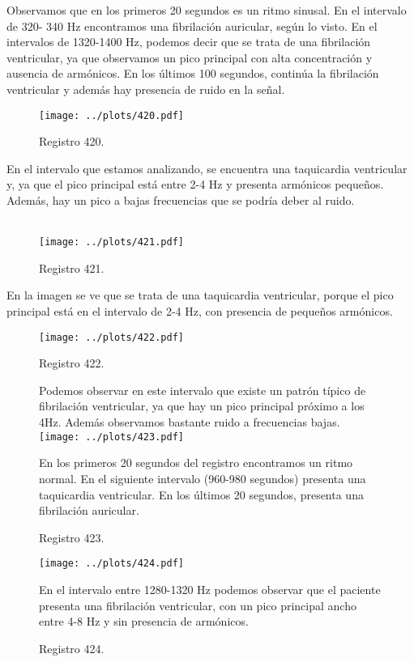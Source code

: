 \documentclass{article}
\begin{document}
Observamos que en los primeros 20 segundos es un ritmo sinusal. En el
intervalo de 320- 340 Hz encontramos una fibrilación auricular, según
lo visto. En el intervalos de 1320-1400 Hz, podemos decir que se trata
de una fibrilación ventricular, ya que observamos un pico principal
con alta concentración y ausencia de armónicos. En los últimos 100
segundos, continúa la fibrilación ventricular y además hay presencia
de ruido en la señal.
\newpage

\begin{figure}[h]
\centering
\texttt{[image: ../plots/420.pdf]}
\caption{Registro 420.}
\end{figure}

En el intervalo que estamos analizando, se encuentra una taquicardia
ventricular y, ya que el pico principal está entre 2-4 Hz y presenta
armónicos pequeños. Además, hay un pico a bajas frecuencias que se
podría deber al ruido.
\\\\

\begin{figure}[h]
\centering
\texttt{[image: ../plots/421.pdf]}
\caption{Registro 421.}
\end{figure}

En la imagen se ve que se trata de una taquicardia ventricular, porque
el pico principal está en el intervalo de 2-4 Hz, con presencia de
pequeños armónicos.

\newpage

\begin{figure}[h]
\begin{center}
\texttt{[image: ../plots/422.pdf]}
\end{center}
\vspace{-1.5cm}
\caption{Registro 422.}
Podemos observar en este intervalo que existe un patrón típico de
fibrilación ventricular, ya que hay un pico principal próximo
a los 4Hz. Además observamos bastante ruido a frecuencias
bajas.
\texttt{[image: ../plots/423.pdf]}
\vspace{-2.1cm}
\caption{Registro 423.}
En los primeros 20 segundos del registro encontramos  un ritmo normal.
En el siguiente intervalo (960-980 segundos) presenta una taquicardia
ventricular. En los últimos 20 segundos, presenta una fibrilación
auricular.
\end{figure}

\newpage
\begin{figure}[h]
\texttt{[image: ../plots/424.pdf]}
\caption{Registro 424.}
\quad En el intervalo entre 1280-1320 Hz podemos observar que el paciente
presenta una fibrilación ventricular, con un pico principal ancho
entre 4-8 Hz y sin presencia de armónicos.
\end{figure}
\end{document}
